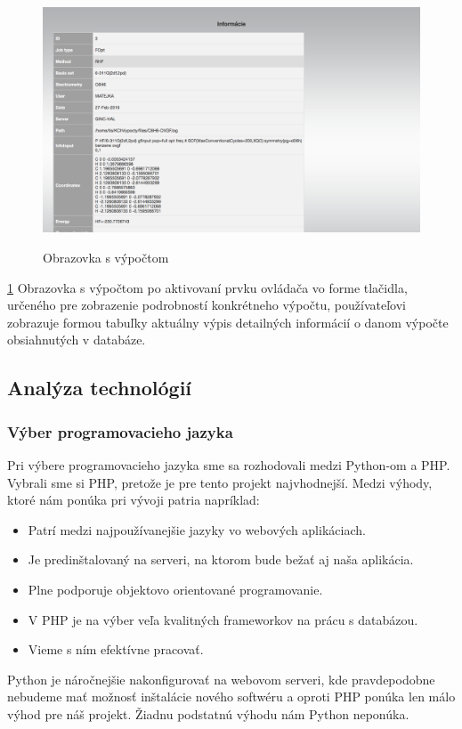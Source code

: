 \documentclass[12pt,a4paper]{article}
\begin{document}
\begin{figure}[H]
	\caption{Obrazovka s výpočtom}
	\includegraphics[width=\textwidth]{item}
	\label{fig:ui3}
\end{figure}
\ref{fig:ui3}
Obrazovka s výpočtom po aktivovaní prvku ovládača vo forme tlačidla, určeného pre zobrazenie podrobností konkrétneho výpočtu, používateľovi zobrazuje formou tabuľky aktuálny výpis detailných informácií o danom výpočte obsiahnutých v databáze.

\subsection{Analýza technológií}

\subsubsection{Výber programovacieho jazyka}
Pri výbere programovacieho jazyka sme sa rozhodovali medzi Python-om a PHP. Vybrali sme si PHP, pretože je pre tento projekt najvhodnejší. Medzi výhody, ktoré nám ponúka pri vývoji patria napríklad:
\begin{itemize}
	\item Patrí medzi najpoužívanejšie jazyky vo webových aplikáciach.
	\item Je predinštalovaný na serveri, na ktorom bude bežať aj naša aplikácia.
	\item Plne podporuje objektovo orientované programovanie.
	\item V PHP je na výber veľa kvalitných frameworkov na prácu s databázou.
	\item Vieme s ním efektívne pracovať.
\end{itemize}
Python je náročnejšie nakonfigurovať na webovom serveri, kde pravdepodobne nebudeme mať možnosť inštalácie nového softwéru a oproti PHP ponúka len málo výhod pre náš projekt. Žiadnu podstatnú výhodu nám Python neponúka.
\end{document}
